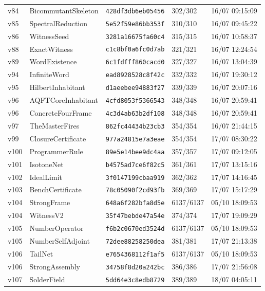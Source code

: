 \documentclass[11pt]{article}
\theoremstyle{definition}\newtheorem{deriv}{Derivação}
\begin{document}
{\begin{longtable}{@{}lllll@{}}
v84 & BicommutantSkeleton & \texttt{428df3db6eb05456} & 302/302 & 16/07 09:15:09 \\
v85 & SpectralReduction & \texttt{5e52f59e86bb353f} & 310/310 & 16/07 09:45:22 \\
v86 & WitnessSeed & \texttt{3281a16675fa60c4} & 315/315 & 16/07 10:58:37 \\
v88 & ExactWitness & \texttt{c1c8bf0a6fc0d7ab} & 321/321 & 16/07 12:24:54 \\
v89 & WordExistence & \texttt{6c1fdfff860cacd0} & 327/327 & 16/07 13:04:39 \\
v94 & InfiniteWord & \texttt{ead8928528c8f42c} & 332/332 & 16/07 19:30:12 \\
v95 & HilbertInhabitant & \texttt{d1aeebee94883f27} & 339/339 & 16/07 20:07:16 \\
v96 & AQFTCoreInhabitant & \texttt{4cfd8053f5366543} & 348/348 & 16/07 20:59:41 \\
v96 & ConcreteFourFrame & \texttt{4c3d4ab63b2df108} & 348/348 & 16/07 20:59:41 \\
v97 & TheMasterFires & \texttt{862fc44434b23cb3} & 354/354 & 16/07 21:44:15 \\
v99 & ClosureCertificate & \texttt{977a24815e7a3eae} & 354/354 & 17/07 08:30:22 \\
v100 & ProgrammerRule & \texttt{89e5e14bee9dc4aa} & 357/357 & 17/07 09:12:05 \\
v101 & IsotoneNet & \texttt{b4575ad7ce6f82c5} & 361/361 & 17/07 13:15:16 \\
v102 & IdealLimit & \texttt{3f0147199cbaa919} & 362/362 & 17/07 14:16:45 \\
v103 & BenchCertificate & \texttt{78c05090f2cd93fb} & 369/369 & 17/07 15:17:29 \\
v104 & StrongFrame & \texttt{648a6f282bfa8d5e} & 6137/6137 & 05/10 18:09:53 \\
v104 & WitnessV2 & \texttt{35f47bebde47a54e} & 374/374 & 17/07 19:09:29 \\
v105 & NumberOperator & \texttt{f6b2c0670ed3524d} & 6137/6137 & 05/10 18:09:53 \\
v105 & NumberSelfAdjoint & \texttt{72dee88258250dea} & 381/381 & 17/07 21:13:38 \\
v106 & TailNet & \texttt{e7654368112f1af5} & 6137/6137 & 05/10 18:09:53 \\
v106 & StrongAssembly & \texttt{34758f8d20a242bc} & 386/386 & 17/07 21:56:08 \\
v107 & SolderField & \texttt{5dd64e3c8edb8729} & 389/389 & 18/07 04:05:11 \\

\end{longtable}}
\end{document}

